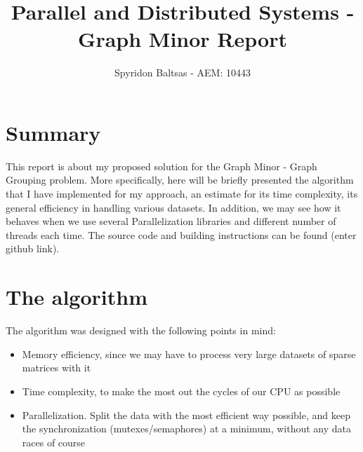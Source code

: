 \documentclass[11pt]{article}
\author{Spyridon Baltsas - AEM: 10443}
\date{}
\title{Parallel and Distributed Systems - Graph Minor Report}
\begin{document}
\maketitle

\section{Summary}
\label{sec:orga686469}
This report is about my proposed solution for the Graph Minor - Graph Grouping problem. More specifically, here will be briefly presented the algorithm that I have implemented for my approach, an estimate for its time complexity, its general efficiency in handling various datasets. In addition, we may see how it behaves when we use several Parallelization libraries and different number of threads each time. The source code and building instructions can be found (enter github link).
\section{The algorithm}
\label{sec:org09bae57}
The algorithm was designed with the following points in mind:
\begin{itemize}
\item Memory efficiency, since we may have to process very large datasets of sparse matrices with it
\item Time complexity, to make the most out the cycles of our CPU as possible
\item Parallelization. Split the data with the most efficient way possible, and keep the synchronization (mutexes/semaphores) at a minimum, without any data races of course
\end{itemize}
\end{document}
